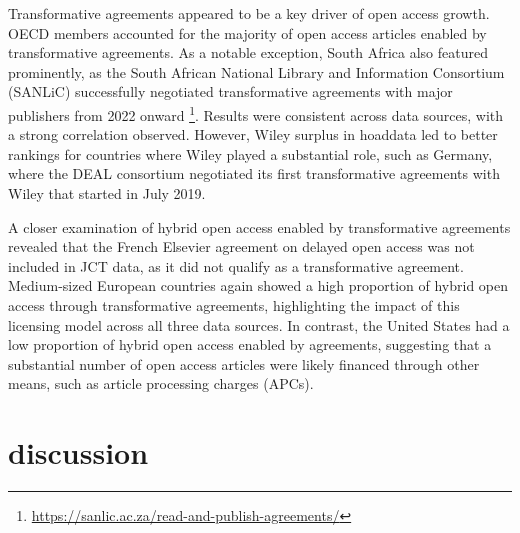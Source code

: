 \documentclass[a4paper,man,floatsintext,longtable,noextraspace,10pt]{apa6}
\begin{document}
Transformative agreements appeared to be a key driver of open access
growth. OECD members accounted for the majority of open access articles
enabled by transformative agreements. As a notable exception, South
Africa also featured prominently, as the South African National Library
and Information Consortium (SANLiC) successfully negotiated
transformative agreements with major publishers from 2022 onward
\footnote{\url{https://sanlic.ac.za/read-and-publish-agreements/}}.
Results were consistent across data sources, with a strong correlation
observed. However, Wiley surplus in hoaddata led to better rankings for
countries where Wiley played a substantial role, such as Germany, where
the DEAL consortium negotiated its first transformative agreements with
Wiley that started in July 2019.

A closer examination of hybrid open access enabled by transformative
agreements revealed that the French Elsevier agreement on delayed open
access was not included in JCT data, as it did not qualify as a
transformative agreement. Medium-sized European countries again showed a
high proportion of hybrid open access through transformative agreements,
highlighting the impact of this licensing model across all three data
sources. In contrast, the United States had a low proportion of hybrid
open access enabled by agreements, suggesting that a substantial number
of open access articles were likely financed through other means, such
as article processing charges (APCs).

\section{discussion}\label{discussion}
\end{document}
